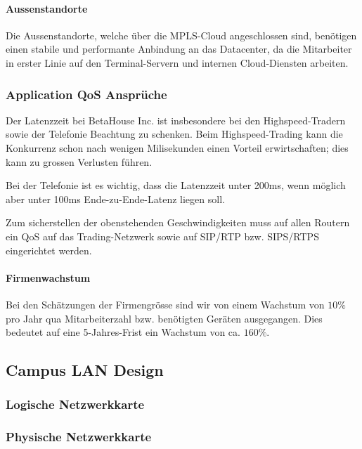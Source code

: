 \paragraph{Aussenstandorte}

Die Aussenstandorte, welche über die MPLS-Cloud angeschlossen sind, benötigen einen stabile und performante Anbindung an das Datacenter, da die Mitarbeiter in erster Linie auf den Terminal-Servern und internen Cloud-Diensten arbeiten.

\subsubsection{Application QoS Ansprüche}

Der Latenzzeit bei BetaHouse Inc. ist insbesondere bei den Highspeed-Tradern sowie der Telefonie Beachtung zu schenken. Beim Highspeed-Trading kann die Konkurrenz schon nach wenigen Milisekunden einen Vorteil erwirtschaften; dies kann zu grossen Verlusten führen.

Bei der Telefonie ist es wichtig, dass die Latenzzeit unter 200ms, wenn möglich aber unter 100ms Ende-zu-Ende-Latenz liegen soll.

Zum sicherstellen der obenstehenden Geschwindigkeiten muss auf allen Routern ein QoS auf das Trading-Netzwerk sowie auf SIP/RTP bzw. SIPS/RTPS eingerichtet werden.


\paragraph{Firmenwachstum}
Bei den Schätzungen der Firmengrösse sind wir von einem Wachstum von $10\%$ pro Jahr qua Mitarbeiterzahl bzw. benötigten Geräten ausgegangen. Dies bedeutet auf eine 5-Jahres-Frist ein Wachstum von ca. $160\%$.

\subsection{Campus LAN Design}

\subsubsection{Logische Netzwerkkarte}
\subsubsection{Physische Netzwerkkarte}

